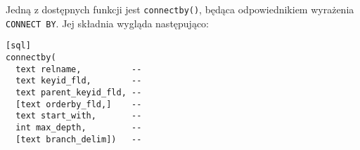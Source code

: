 Jedną z dostępnych funkcji jest \texttt{connectby()}, będąca odpowiednikiem wyrażenia \texttt{CONNECT BY}. Jej składnia wygląda następująco:

\begin{verbatim}[sql]
connectby(
  text relname,          -- 
  text keyid_fld,        -- 
  text parent_keyid_fld, -- 
  [text orderby_fld,]    -- 
  text start_with,       -- 
  int max_depth,         -- 
  [text branch_delim])   -- 
\end{verbatim}





% 




